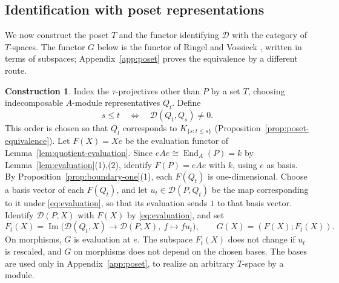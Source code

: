 \documentclass[a4paper,reqno,10pt]{amsart}
\theoremstyle{definition}
\newtheorem{construction}[theorem]{Construction}
\numberwithin{equation}{section}
\DeclareMathOperator{\End}{End}
\newcommand{\cD}{\mathcal D}
\begin{document}
\subsection{Identification with poset representations}
We now construct the poset \(T\) and the functor identifying \(\cD\) with
the category of \(T\)-spaces. The functor \(G\) below is the functor of
Ringel and Vossieck \cite[Section~1, Theorem~3, p.~221, and
Section~7]{RV}, written in terms of subspaces; Appendix~\ref{app:poset}
proves the equivalence by a different route.
\begin{construction}\label{con:poset}
Index the \(\tau\)-projectives other than \(P\) by a set \(T\), choosing
indecomposable \(A\)-module representatives \(Q_t\). Define
\[
 s\leq t\quad\Longleftrightarrow\quad\cD(Q_t,Q_s)\ne0.
\]
This order is chosen so that \(Q_t\) corresponds to
\(K_{\{s:t\leq s\}}\) (Proposition~\ref{prop:poset-equivalence}).
Let \(F(X)=Xe\) be the evaluation functor of
Lemma~\ref{lem:quotient-evaluation}. Since \(eAe\cong\End_A(P)=k\) by
Lemma~\ref{lem:evaluation}(1),(2), identify \(F(P)=eAe\) with \(k\), using
\(e\) as basis.
By Proposition~\ref{prop:boundary-one}(1), each \(F(Q_t)\) is one-dimensional.
Choose a basis vector of each \(F(Q_t)\), and let \(u_t\in\cD(P,Q_t)\) be
the map corresponding to it under \eqref{eq:evaluation}, so that its
evaluation sends \(1\) to that basis vector. Identify
\(\cD(P,X)\) with \(F(X)\) by \eqref{eq:evaluation}, and set
\begin{equation}\label{eq:poset-functor}
 F_t(X)=\operatorname{Im}\bigl(\cD(Q_t,X)\longrightarrow\cD(P,X),
                  \ f\longmapsto fu_t\bigr),\qquad
 G(X)=(F(X);F_t(X)).
\end{equation}
On morphisms, \(G\) is evaluation at \(e\).
The subspace \(F_t(X)\) does not change if \(u_t\) is rescaled, and \(G\)
on morphisms does not depend on the chosen bases. The bases are used only
in Appendix~\ref{app:poset}, to realize an arbitrary \(T\)-space by a
module.
\end{construction}
\end{document}
